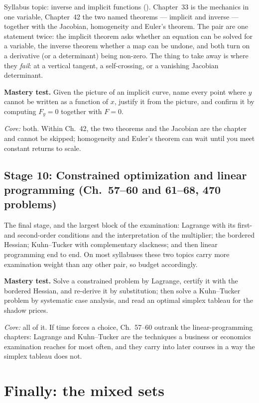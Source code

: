Syllabus topic: inverse and implicit functions
(). Chapter~33 is the mechanics in one
variable, Chapter~42 the two named theorems --- implicit and inverse ---
together with the Jacobian, homogeneity and Euler's theorem. The pair are
one statement twice: the implicit theorem asks whether an equation can be
solved for a variable, the inverse theorem whether a map can be undone, and
both turn on a derivative (or a determinant) being non-zero. The thing to
take away is where they \emph{fail}: at a vertical tangent, a
self-crossing, or a vanishing Jacobian determinant.

\textbf{Mastery test.} Given the picture of an implicit curve, name every
point where $y$ cannot be written as a function of $x$, justify it from the
picture, and confirm it by computing $F_{y}=0$ together with $F=0$.

\emph{Core:} both. Within Ch.~42, the two theorems and the Jacobian are the
chapter and cannot be skipped; homogeneity and Euler's theorem can wait
until you meet constant returns to scale.

\subsection*{Stage 10: Constrained optimization and linear programming (Ch.~57--60 and 61--68, 470 problems)}

The final stage, and the largest block of the examination: Lagrange with its
first- and second-order conditions and the interpretation of the multiplier;
the bordered Hessian; Kuhn--Tucker with complementary slackness; and then
linear programming end to end. On most syllabuses these two topics carry
more examination weight than any other pair, so budget accordingly.

\textbf{Mastery test.} Solve a constrained problem by Lagrange, certify it
with the bordered Hessian, and re-derive it by substitution; then solve a
Kuhn--Tucker problem by systematic case analysis, and read an optimal
simplex tableau for the shadow prices.

\emph{Core:} all of it. If time forces a choice, Ch.~57--60 outrank the
linear-programming chapters: Lagrange and Kuhn--Tucker are the techniques a
business or economics examination reaches for most often, and they carry
into later courses in a way the simplex tableau does not.

\section*{Finally: the mixed sets}

